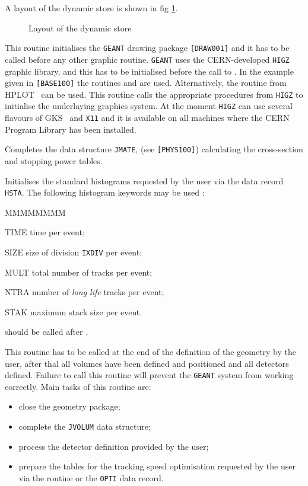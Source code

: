 A layout of the dynamic store is shown in fig \ref{fg:base110-1}.

\begin{figure}[hbt]
      \centering
      \caption{Layout of the dynamic store}
      \label{fg:base110-1}
\end{figure}

This routine
initialises the {\tt GEANT} drawing package {\tt[DRAW001]} and it has
to be called before any other graphic routine. {\tt GEANT} uses the
CERN-developed {\tt HIGZ}~\cite{bib-HIGZ} graphic library, and this
has to be initialised before the call to .
In the example given
in {\tt [BASE100]} the routines  and 
are used. Alternatively, the routine  from HPLOT~\cite{bib-HPLOT}
can be used. This routine calls the appropriate procedures from {\tt HIGZ} to 
initialise the underlaying graphics system. At the moment {\tt HIGZ} can 
use several flavours of GKS~\cite{bib-gks2d,bib-gks3d,bib-GKS1}
and {\tt X11} and it is available on all machines where the CERN Program
Library has been installed.

Completes the data structure {\tt JMATE}, (see {\tt [PHYS100]}) calculating the
cross-section and stopping power tables.

Initialises the standard histograms requested by the user via the
data record {\tt HSTA}.
The following histogram keywords may be used :
\begin{DLtt}{MMMMMMMM}
\item[TIME]    time per event;
\item[SIZE]     size of division {\tt IXDIV} per event;
\item[MULT]    total number of tracks per event;
\item[NTRA]    number of {\it long life} tracks per event;
\item[STAK]    maximum stack size per event.
\end{DLtt}

 should be called after .

This routine has to be called at the end of the definition
of the geometry by the user, after thal all volumes have been defined
and positioned and all detectors defined. 
Failure to call this routine will prevent
the {\tt GEANT} system from working correctly. Main tasks of this routine
are:
\begin{itemize}
\item close the geometry package;
\item complete the {\tt JVOLUM} data structure;
\item process the detector definition provided by the user;
\item prepare the tables for the tracking speed optimisation requested
by the user via the  routine or the {\tt OPTI} data record.
\end{itemize}
